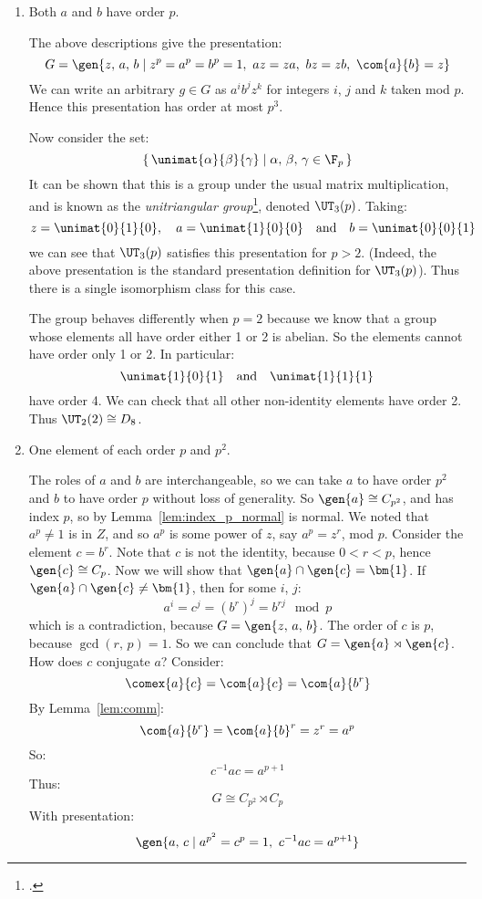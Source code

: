 \begin{enumerate}
    \item Both \(a\) and \(b\) have order \(p\).

        The above descriptions give the presentation:
        \[G = \gen{z,\,a,\,b \mid z^p = a^p = b^p = 1,\ az = za,\ bz = zb,\ \com{a}{b} = z}\]
        We can write an arbitrary \(g \in G\) as \(a^i b^j z^k\) for integers \(i\), \(j\) and \(k\) taken mod \(p\).
        Hence this presentation has order at most \(p^3\).

        Now consider the set:
        \[\left\{\,\unimat{\alpha}{\beta}{\gamma} \mid \alpha,\,\beta,\,\gamma \in \F_p\,\right\}\]
        It can be shown that this is a group under the usual matrix multiplication, and is known as the
        \emph{unitriangular group}\footcite{unitriangular}, denoted \(\UT_3(p)\).
        Taking:
        \[z = \unimat{0}{1}{0}, \quad a = \unimat{1}{0}{0} \quad \text{and} \quad b = \unimat{0}{0}{1}\]
        we can see that \(\UT_3(p)\) satisfies this presentation for \(p > 2\).
        (Indeed, the above presentation is the standard presentation definition for \(\UT_3(p)\)).
        Thus there is a single isomorphism class for this case.

        The group behaves differently when \(p = 2\) because we know that a group whose elements all have order either 1
        or 2 is abelian.
        So the elements cannot have order only 1 or 2.
        In particular:
        \[\unimat{1}{0}{1} \quad \text{and} \quad \unimat{1}{1}{1}\]
        have order 4.
        We can check that all other non-identity elements have order 2.
        Thus \(\UT_2(2) \cong D_8\).

    \item One element of each order \(p\) and \(p^2\).

        The roles of \(a\) and \(b\) are interchangeable, so we can take \(a\) to have order \(p^2\) and \(b\) to have
        order \(p\) without loss of generality.
        So \(\gen{a} \cong C_{p^2}\), and has index \(p\), so by Lemma~\ref{lem:index_p_normal} is normal.
        We noted that \(a^p \neq 1\) is in \(Z\), and so \(a^p\) is some power of \(z\), say \(a^p = z^r\), mod \(p\).
        Consider the element \(c = b^r\).
        Note that \(c\) is not the identity, because \(0 < r < p\), hence \(\gen{c} \cong C_p\).
        Now we will show that \(\gen{a} \cap \gen{c} = \bm{1}\).
        If \(\gen{a} \cap \gen{c} \neq \bm{1}\), then for some \(i\), \(j\):
        \[a^i = c^j = {(b^r)}^j = b^{rj} \mod{p}\]
        which is a contradiction, because \(G = \gen{z,\,a,\,b}\).
        The order of \(c\) is \(p\), because \(\gcd(r,\,p) = 1\).
        So we can conclude that \(G = \gen{a} \rtimes \gen{c}\).
        How does \(c\) conjugate \(a\)?
        Consider:
        \[\comex{a}{c} = \com{a}{c} = \com{a}{b^r}\]
        By Lemma~\ref{lem:comm}:
        \[\com{a}{b^r} = \com{a}{b}^r = z^r = a^p\]
        So:
        \[c^{-1}ac = a^{p + 1}\]
        Thus:
        \[G \cong C_{p^2} \rtimes C_p\]
        With presentation:
        \[\gen{a,\,c \mid a^{p^2} = c^p = 1,\ c^{-1}ac = a^{p + 1}}\]


\end{enumerate}
